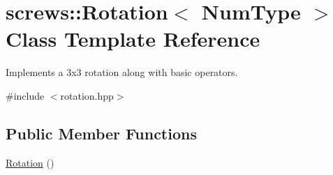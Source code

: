 \hypertarget{classscrews_1_1_rotation}{\section{screws\+:\+:Rotation$<$ Num\+Type $>$ Class Template Reference}
\label{classscrews_1_1_rotation}
}


Implements a 3x3 rotation along with basic operators.  




{\ttfamily \#include $<$rotation.\+hpp$>$}

\subsection*{Public Member Functions}
\begin{DoxyCompactItemize}
\item 
\hypertarget{classscrews_1_1_rotation_a13ea1d345ca0a92c0f09b4de544ca460}{\hyperlink{classscrews_1_1_rotation_a13ea1d345ca0a92c0f09b4de544ca460}{Rotation} ()}\label{classscrews_1_1_rotation_a13ea1d345ca0a92c0f09b4de544ca460}


\end{DoxyCompactItemize}
